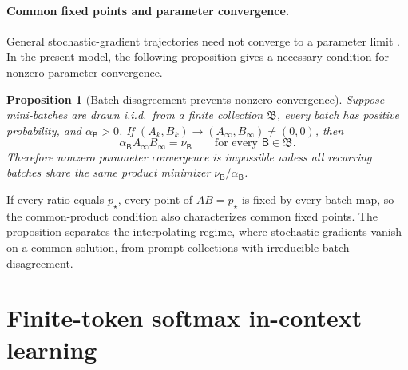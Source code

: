 \documentclass[11pt]{article}
\newtheorem{proposition}[theorem]{Proposition}
\newcommand{\E}{\mathbb E}
\begin{document}
\paragraph{Common fixed points and parameter convergence.}
General stochastic-gradient trajectories need not converge to a parameter
limit \citep{zhang2022neural}.  In the present model, the following
proposition gives a necessary condition for nonzero parameter convergence.

\begin{proposition}[Batch disagreement prevents nonzero convergence]
\label{thm:no-convergence}
Suppose mini-batches are drawn i.i.d.\ from a finite collection
\(\mathfrak B\), every batch has positive probability, and
\(\alpha_{\mathsf B}>0\).  If
\((A_k,B_k)\to(A_\infty,B_\infty)\ne(0,0)\), then
\begin{equation}
\label{eq:common-interpolation}
    \alpha_{\mathsf B}A_\infty B_\infty
    =
    \nu_{\mathsf B}
    \qquad\text{for every }\mathsf B\in\mathfrak B.
\end{equation}
Therefore nonzero parameter convergence is impossible unless all recurring
batches share the same product minimizer
\(\nu_{\mathsf B}/\alpha_{\mathsf B}\).
\end{proposition}

If every ratio equals \(p_\star\), every point of \(AB=p_\star\) is fixed by
every batch map, so the common-product condition also characterizes common
fixed points.  The proposition separates the interpolating regime, where
stochastic gradients vanish on a common solution, from prompt collections
with irreducible batch disagreement.

\section{Finite-token softmax in-context learning}
\label{sec:softmax}

\end{document}
